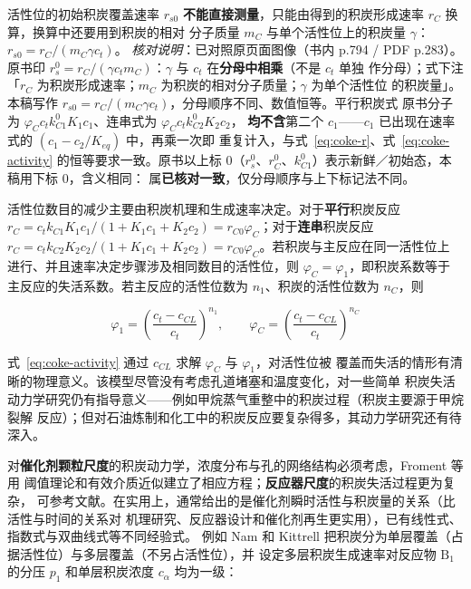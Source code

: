\begin{principle}
活性位的初始积炭覆盖速率 $r_{s0}$
\textbf{不能直接测量}，只能由得到的积炭形成速率 $r_C$ 换算，换算中还要用到积炭的相对
分子质量 $m_C$ 与单个活性位上的积炭量 $\gamma$：
$r_{s0}=r_C/(m_C\gamma c_t)$。
\emph{核对说明}：已对照原页面图像（书内 p.794 / PDF p.283）。原书印
$r_s^{0}=r_C/(\gamma c_tm_C)$：$\gamma$ 与 $c_t$ 在\textbf{分母中相乘}（不是 $c_t$ 单独
作分母）；式下注「$r_C$ 为积炭形成速率；$m_C$ 为积炭的相对分子质量；$\gamma$ 为单个活性位
的积炭量」。本稿写作 $r_{s0}=r_C/(m_C\gamma c_t)$，分母顺序不同、数值恒等。平行积炭式
原书分子为 $\varphi_Cc_tk_{C1}^{0}K_1c_1$、连串式为 $\varphi_Cc_tk_{C2}^{0}K_2c_2$，
\textbf{均不含}第二个 $c_1$——$c_1$ 已出现在速率式的 $(c_1-c_2/K_{eq})$ 中，再乘一次即
重复计入，与式~\eqref{eq:coke-r}、式~\eqref{eq:coke-activity} 的恒等要求一致。原书以上标
$0$（$r_s^{0}$、$r_C^{0}$、$k_{C1}^{0}$）表示新鲜／初始态，本稿用下标 $0$，含义相同：
属\textbf{已核对一致}，仅分母顺序与上下标记法不同。
\end{principle}

活性位数目的减少主要由积炭机理和生成速率决定。对于\textbf{平行}积炭反应
$r_C=c_tk_{C1}K_1c_1/(1+K_1c_1+K_2c_2)=r_{C0}\varphi_C$；对于\textbf{连串}积炭反应
$r_C=c_tk_{C2}K_2c_2/(1+K_1c_1+K_2c_2)=r_{C0}\varphi_C$。若积炭与主反应在同一活性位上
进行、并且速率决定步骤涉及相同数目的活性位，则 $\varphi_C=\varphi_1$，即积炭系数等于
主反应的失活系数。若主反应的活性位数为 $n_1$、积炭的活性位数为 $n_C$，则

\begin{equation}
\varphi_1=\left(\frac{c_t-c_{CL}}{c_t}\right)^{n_1},\qquad
\varphi_C=\left(\frac{c_t-c_{CL}}{c_t}\right)^{n_C}
\label{eq:coke-phi}
\end{equation}

式~\eqref{eq:coke-activity} 通过 $c_{CL}$ 求解 $\varphi_C$ 与 $\varphi_1$，对活性位被
覆盖而失活的情形有清晰的物理意义。该模型尽管没有考虑孔道堵塞和温度变化，对一些简单
积炭失活动力学研究仍有指导意义——例如甲烷蒸气重整中的积炭过程（积炭主要源于甲烷裂解
反应）；但对石油炼制和化工中的积炭反应要复杂得多，其动力学研究还有待深入。

对\textbf{催化剂颗粒尺度}的积炭动力学，浓度分布与孔的网络结构必须考虑，Froment 等用
阈值理论和有效介质近似建立了相应方程；\textbf{反应器尺度}的积炭失活过程更为复杂，
可参考文献。在实用上，通常给出的是催化剂瞬时活性与积炭量的关系（比活性与时间的关系对
机理研究、反应器设计和催化剂再生更实用），已有线性式、指数式与双曲线式等不同经验式。
例如 Nam 和 Kittrell 把积炭分为单层覆盖（占据活性位）与多层覆盖（不另占活性位），并
设定多层积炭生成速率对反应物 $\mathrm{B_1}$ 的分压 $p_1$ 和单层积炭浓度 $c_\alpha$
均为一级：

